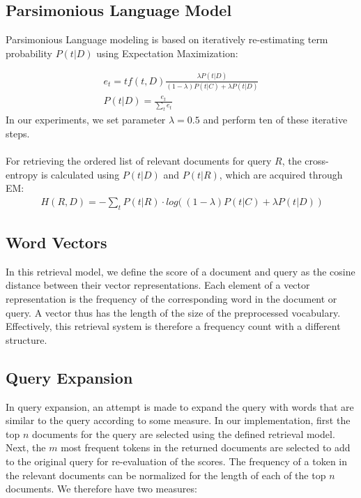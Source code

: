 \documentclass{article}
\begin{document}
\subsection*{Parsimonious Language Model}

Parsimonious Language modeling is based on iteratively re-estimating term probability $P(t|D)$ using Expectation Maximization:

\begin{align*}
e_t = tf(t,D)\frac{\lambda P(t|D)}{(1-\lambda)P(t|C)+\lambda P(t|D)} \\
P(t|D) = \frac{e_t}{\sum_t e_t}
\end{align*}
In our experiments, we set parameter $\lambda = 0.5$ and perform ten of these iterative steps.\\ \\
For retrieving the ordered list of relevant documents for query $R$, the cross-entropy is calculated using $P(t|D)$ and $P(t|R)$, which are acquired through EM:
\begin{align*}
H(R,D) = -\sum_t P(t|R)\cdot log\big( \ (1-\lambda)P(t|C)+\lambda P(t|D) \ \big)
\end{align*}

\subsection*{Word Vectors}

In this retrieval model, we define the score of a document and query as the cosine distance between their vector representations. Each element of a vector representation is the frequency of the corresponding word in the document or query. A vector thus has the length of the size of the preprocessed vocabulary. Effectively, this retrieval system is therefore a frequency count with a different structure.

\subsection*{Query Expansion}
In query expansion, an attempt is made to expand the query with words that are similar to the query according to some measure. In our implementation, first the top $n$ documents for the query are selected using the defined retrieval model. Next, the $m$ most frequent tokens in the returned documents are selected to add to the original query for re-evaluation of the scores. The frequency of a token in the relevant documents can be normalized for the length of each of the top $n$ documents. We therefore have two measures:
\end{document}
